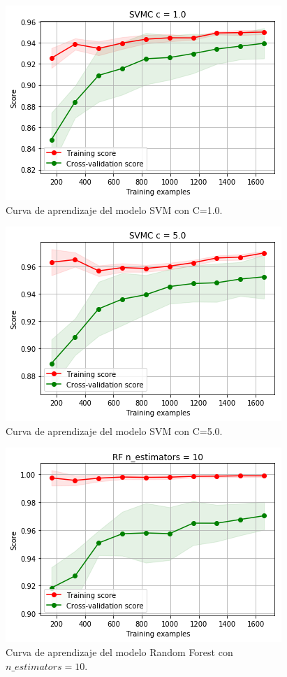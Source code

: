 \documentclass[11pt,a4paper]{article}
\begin{document}
\begin{figure}[H]
    \centering
    \includegraphics[scale=0.7]{img/lc-svm-c-1.png}
    \caption{Curva de aprendizaje del modelo SVM con C=1.0.}
    \label{fig:lc-svm-c-1}
\end{figure}

\begin{figure}[H]
    \centering
    \includegraphics[scale=0.7]{img/lc-svm-c-5.png}
    \caption{Curva de aprendizaje del modelo SVM con C=5.0.}
    \label{fig:lc-svm-c-5}
\end{figure}

\begin{figure}[H]
    \centering
    \includegraphics[scale=0.7]{img/lc-rf-n-10.png}
    \caption{Curva de aprendizaje del modelo Random Forest con $n\_estimators=10$.}
    \label{fig:lc-rf-n-10}
\end{figure}
\end{document}
